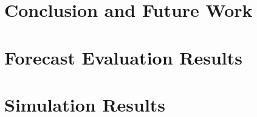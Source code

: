 \documentclass[a4paper,11pt,twoside]{memoir}
\begin{document}


\chapter{Conclusion and Future Work}
\label{ch:conclusion}




\appendix

\chapter{Forecast Evaluation Results}
\label{ch:appendix_forecast_results}




\chapter{Simulation Results}
\label{ch:appendix_simulation_results}





\backmatter



\end{document}
